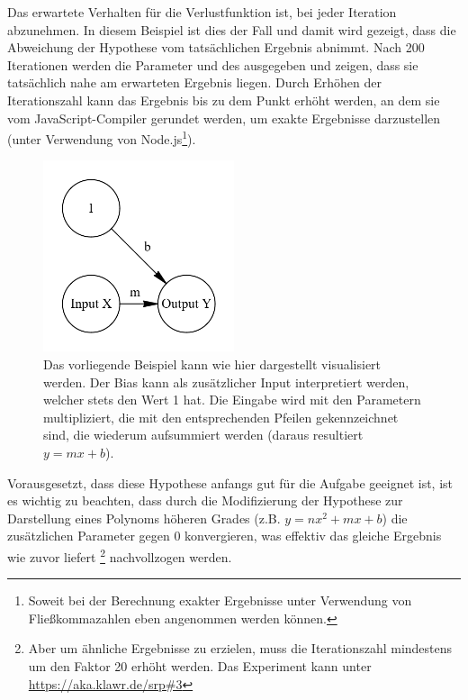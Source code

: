 Das erwartete Verhalten für die Verlustfunktion ist, bei jeder Iteration abzunehmen.
In diesem Beispiel ist dies der Fall und damit wird gezeigt, dass die Abweichung der Hypothese vom tatsächlichen Ergebnis abnimmt.
Nach 200 Iterationen werden die Parameter  und  des  ausgegeben und zeigen, dass sie tatsächlich nahe am erwarteten Ergebnis liegen.
Durch Erhöhen der Iterationszahl kann das Ergebnis bis zu dem Punkt erhöht werden, an dem sie vom JavaScript-Compiler gerundet werden, um exakte Ergebnisse darzustellen (unter Verwendung von Node.js\footnote{ Soweit bei der Berechnung exakter Ergebnisse unter Verwendung von Fließkommazahlen eben angenommen werden können.}).

\begin{figure}
    \centering
    \caption{Das vorliegende Beispiel kann wie hier dargestellt visualisiert werden. Der Bias kann als zusätzlicher Input interpretiert werden, welcher stets den Wert 1 hat. Die Eingabe wird mit den Parametern multipliziert, die mit den entsprechenden Pfeilen gekennzeichnet sind, die wiederum aufsummiert werden (daraus resultiert $y = mx + b$).}
    \includegraphics[width=0.5\textwidth]{images/1_simplest_nn.png}
\end{figure}

Vorausgesetzt, dass diese Hypothese anfangs gut für die Aufgabe geeignet ist, ist es wichtig zu beachten, dass durch die Modifizierung der Hypothese zur Darstellung eines Polynoms höheren Grades (z.B. $y = nx^2 + mx + b$) die zusätzlichen Parameter gegen 0 konvergieren, was effektiv das gleiche Ergebnis wie zuvor liefert \footnote{Aber um ähnliche Ergebnisse zu erzielen, muss die Iterationszahl mindestens um den Faktor 20 erhöht werden.
Das Experiment kann unter \url{https://aka.klawr.de/srp\#3}} nachvollzogen werden.
